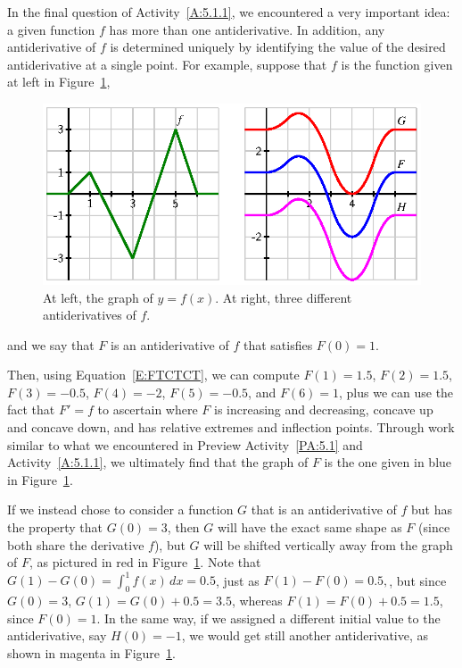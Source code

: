 In the final question of Activity~\ref{A:5.1.1}, we encountered a very important idea:  a given function $f$ has more than one antiderivative.  In addition, any antiderivative of $f$ is determined uniquely by identifying the value of the desired antiderivative at a single point.  For example, suppose that $f$ is the function given at left in Figure~\ref{F:5.1.Ex1},
\begin{figure}[h]
\begin{center}
\includegraphics{figures/5_1_Ex1.eps}
\end{center}
\caption{At left, the graph of $y = f(x)$.  At right, three different antiderivatives of $f$.} \label{F:5.1.Ex1}
\end{figure}
and we say that $F$ is an antiderivative of $f$ that satisfies $F(0) = 1$.  

Then, using Equation~\ref{E:FTCTCT}, we can compute $F(1) = 1.5$, $F(2) = 1.5$, $F(3) = -0.5$, $F(4) = -2$, $F(5) = -0.5$, and $F(6) = 1$, plus we can use the fact that $F' = f$ to ascertain where $F$ is increasing and decreasing, concave up and concave down, and has relative extremes and inflection points.  Through work similar to what we encountered in Preview Activity~\ref{PA:5.1} and Activity~\ref{A:5.1.1}, we ultimately find that the graph of $F$ is the one given in blue in Figure~\ref{F:5.1.Ex1}.

If we instead chose to consider a function $G$ that is an antiderivative of $f$ but has the property that $G(0) = 3$, then $G$ will have the exact same shape as $F$ (since both share the derivative $f$), but $G$ will be shifted vertically away from the graph of $F$, as pictured in red in Figure~\ref{F:5.1.Ex1}.  Note that $G(1) - G(0) = \int_0^1 f(x) \, dx = 0.5$, just as $F(1) - F(0) = 0.5,$, but since $G(0) = 3$, $G(1) = G(0) + 0.5 = 3.5$, whereas $F(1) = F(0) + 0.5 = 1.5$, since $F(0) = 1$.  In the same way, if we assigned a different initial value to the antiderivative, say $H(0) = -1$, we would get still another antiderivative, as shown in magenta in Figure~\ref{F:5.1.Ex1}.


